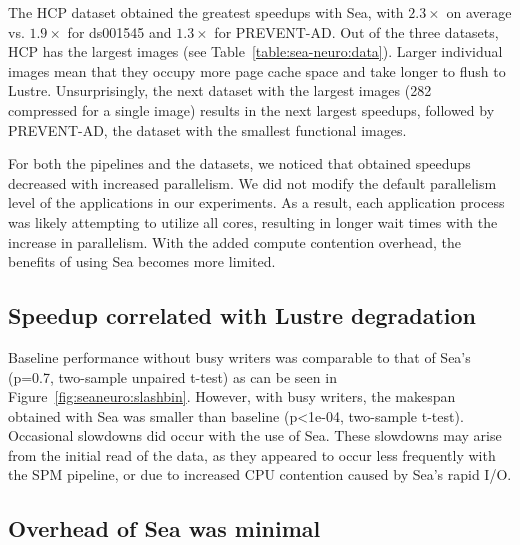 \documentclass[pdflatex,sn-mathphys-num]{sn-jnl}
\theoremstyle{thmstyleone}%
\theoremstyle{thmstyletwo}%
\theoremstyle{thmstylethree}%
\begin{document}
The HCP dataset obtained the greatest speedups with
Sea, with $2.3\times$ on average vs. $1.9\times$ for ds001545  and $1.3\times$ for PREVENT-AD.
Out of the three datasets, HCP has the largest images (see
Table~\ref{table:sea-neuro:data}). Larger individual images mean that they
occupy more page cache space and take longer to flush to Lustre. Unsurprisingly,
the next dataset with the largest images (\SI{282}{\mebi\byte} compressed for a
single image) results in the next largest speedups, followed by PREVENT-AD, the
dataset with the smallest functional images.

For both the pipelines and the datasets, we noticed that obtained speedups
decreased with increased parallelism. We did not modify the default parallelism
level of the applications in our experiments. As a result, each application
process was likely attempting to utilize all cores, resulting in longer wait times
with the increase in parallelism. With the added compute contention overhead, the benefits of using
Sea becomes more limited.


\subsection{Speedup correlated with Lustre degradation}

Baseline performance without busy writers was comparable to that of Sea's (p=0.7, two-sample unpaired t-test) as can be seen in Figure~\ref{fig:seaneuro:slashbin}. However, with
busy writers, the makespan obtained with Sea was smaller than baseline (p<1e-04, two-sample t-test). Occasional slowdowns did occur with the use of Sea. These slowdowns
may arise from the initial read of the data, as they appeared to occur less
frequently with the SPM pipeline, or due to increased CPU contention caused by Sea's rapid I/O.



\subsection{Overhead of Sea was minimal}
\end{document}
